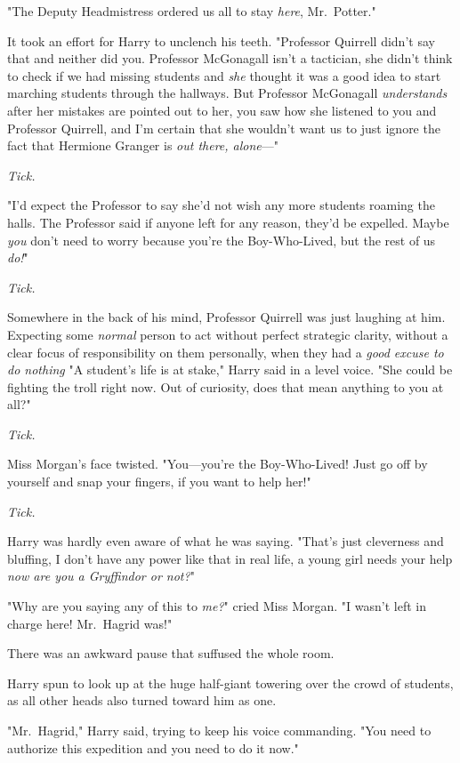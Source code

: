 "The Deputy Headmistress ordered us all to stay \emph{here}, Mr.~Potter."

It took an effort for Harry to unclench his teeth. "Professor Quirrell didn't
say that and neither did you. Professor McGonagall isn't a tactician, she
didn't think to check if we had missing students and \emph{she} thought it was
a good idea to start marching students through the hallways. But Professor
McGonagall \emph{understands} after her mistakes are pointed out to her, you
saw how she listened to you and Professor Quirrell, and I'm certain that she
wouldn't want us to just ignore the fact that Hermione Granger is \emph{out
there, alone}\mbox{---}"

\emph{Tick.}

"I'd expect the Professor to say she'd not wish any more students roaming the
halls. The Professor said if anyone left for any reason, they'd be expelled.
Maybe \emph{you} don't need to worry because you're the Boy-Who-Lived, but the
rest of us \emph{do!}"

\emph{Tick.}

Somewhere in the back of his mind, Professor Quirrell was just laughing at him.
Expecting some \emph{normal} person to act without perfect strategic clarity,
without a clear focus of responsibility on them personally, when they had a
\emph{good excuse to do nothing{\el}} "A student's life is at stake," Harry
said in a level voice. "She could be fighting the troll right now. Out of
curiosity, does that mean anything to you at all?"

\emph{Tick.}

Miss Morgan's face twisted. "You---you're the Boy-Who-Lived! Just go off by
yourself and snap your fingers, if you want to help her!"

\emph{Tick.}

Harry was hardly even aware of what he was saying. "That's just cleverness and
bluffing, I don't have any power like that in real life, a young girl needs
your help \emph{now are you a Gryffindor or not?}"

"Why are you saying any of this to \emph{me?}" cried Miss Morgan. "I wasn't
left in charge here! Mr.~Hagrid was!"

There was an awkward pause that suffused the whole room.

Harry spun to look up at the huge half-giant towering over the crowd of
students, as all other heads also turned toward him as one.

"Mr.~Hagrid," Harry said, trying to keep his voice commanding. "You need to
authorize this expedition and you need to do it now."

